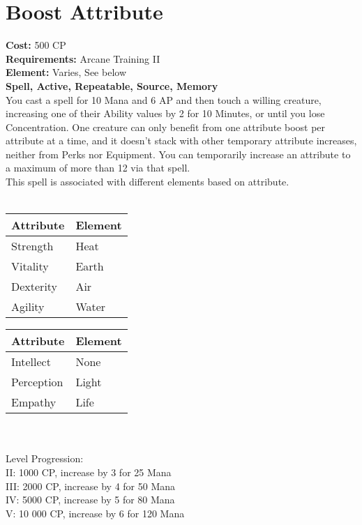 \section{Boost Attribute}
\textbf{Cost:} 500 CP\\
\textbf{Requirements:} Arcane Training II\\
\textbf{Element:} Varies, See below\\
\textbf{Spell, Active, Repeatable, Source, Memory}\\
You cast a spell for 10 Mana and 6 AP and then touch a willing creature, increasing one of their Ability values by 2 for 10 Minutes, or until you lose Concentration. One creature can only benefit from one attribute boost per attribute at a time, and it doesn’t stack with other temporary attribute increases, neither from Perks nor Equipment. You can temporarily increase an attribute to a maximum of more than 12 via that spell.\\
This spell is associated with different elements based on attribute.\\
\\
\begin{minipage}{0.5\textwidth}
	\begin{tabular}{l | l} 
		Attribute & Element\\ \hline
		Strength & Heat\\
		Vitality & Earth\\
		Dexterity & Air\\
		Agility & Water\\
	\end{tabular}
\end{minipage}
\begin{minipage}{0.5\textwidth}
	\begin{tabular}{l | l}
		Attribute & Element\\ \hline
		Intellect & None\\
		Perception & Light\\
		Empathy & Life\\
	\end{tabular}
\end{minipage}
\\
\\
Level Progression:\\
II: 1000 CP, increase by 3 for 25 Mana\\
III: 2000 CP, increase by 4 for 50 Mana\\
IV: 5000 CP, increase by 5 for 80 Mana\\
V: 10 000 CP, increase by 6 for 120 Mana\\
